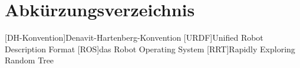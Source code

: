 \chapter*{Abkürzungsverzeichnis}

\begin{acronym}
 [DH-Konvention]{Denavit-Hartenberg-Konvention}
 [URDF]{Unified Robot Description Format}
 [ROS]{das Robot Operating System}
 [RRT]{Rapidly Exploring Random Tree}
\end{acronym}


